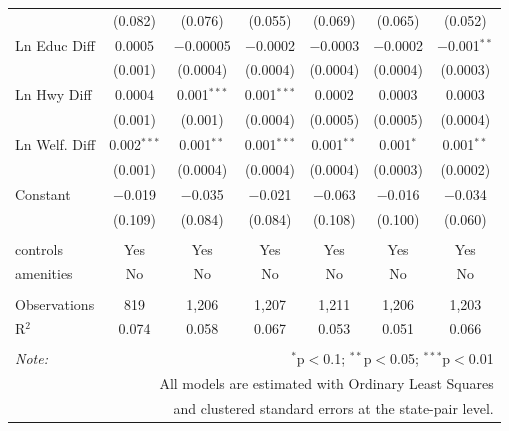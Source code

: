 \begin{table}[!htbp]
\begin{tabular}{@{\extracolsep{5pt}}lcccccc}
  & (0.082) & (0.076) & (0.055) & (0.069) & (0.065) & (0.052) \\ 
  Ln Educ Diff & 0.0005 & $-$0.00005 & $-$0.0002 & $-$0.0003 & $-$0.0002 & $-$0.001$^{**}$ \\ 
  & (0.001) & (0.0004) & (0.0004) & (0.0004) & (0.0004) & (0.0003) \\ 
  Ln Hwy Diff & 0.0004 & 0.001$^{***}$ & 0.001$^{***}$ & 0.0002 & 0.0003 & 0.0003 \\ 
  & (0.001) & (0.001) & (0.0004) & (0.0005) & (0.0005) & (0.0004) \\ 
  Ln Welf. Diff & 0.002$^{***}$ & 0.001$^{**}$ & 0.001$^{***}$ & 0.001$^{**}$ & 0.001$^{*}$ & 0.001$^{**}$ \\ 
  & (0.001) & (0.0004) & (0.0004) & (0.0004) & (0.0003) & (0.0002) \\ 
  Constant & $-$0.019 & $-$0.035 & $-$0.021 & $-$0.063 & $-$0.016 & $-$0.034 \\ 
  & (0.109) & (0.084) & (0.084) & (0.108) & (0.100) & (0.060) \\ 
 \hline \\[-1.8ex] 
controls & Yes & Yes & Yes & Yes & Yes & Yes \\ 
amenities & No & No & No & No & No & No \\ 
\hline \\[-1.8ex] 
Observations & 819 & 1,206 & 1,207 & 1,211 & 1,206 & 1,203 \\ 
R$^{2}$ & 0.074 & 0.058 & 0.067 & 0.053 & 0.051 & 0.066 \\ 
\hline 
\hline \\[-1.8ex] 
\textit{Note:}  & \multicolumn{6}{r}{$^{*}$p$<$0.1; $^{**}$p$<$0.05; $^{***}$p$<$0.01} \\ 
 & \multicolumn{6}{r}{All models are estimated with Ordinary Least Squares} \\ 
 & \multicolumn{6}{r}{and clustered standard errors at the state-pair level.} \\ 
\end{tabular} 
\end{table} 

